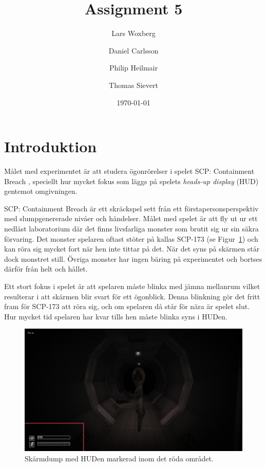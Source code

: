 \documentclass{article}
\author{Lars Woxberg \and Daniel Carlsson \and Philip Heilmair \and Thomas Sievert}
\date{\today}
\title{Assignment 5}
\begin{document}
\maketitle


\section{Introduktion}
Målet med experimentet är att studera ögonrörelser i spelet SCP: Containment Breach \cite{SCP}, speciellt hur mycket fokus som läggs på spelets \textit{heads-up display} (HUD) gentemot omgivningen. 

SCP: Containment Breach är ett skräckspel sett från ett förstapersonsperspektiv med slumpgenererade nivåer och händelser. Målet med spelet är att fly ut ur ett nedlåst laboratorium där det finns livsfarliga monster som brutit sig ur sin säkra förvaring. Det monster spelaren oftast stöter på kallas SCP-173 (se Figur~\ref{hud}) och kan röra sig mycket fort när hen inte tittar på det. När det syns på skärmen står dock monstret still. Övriga monster har ingen bäring på experimentet och bortses därför från helt och hållet.

Ett stort fokus i spelet är att spelaren måste blinka med jämna mellanrum vilket resulterar i att skärmen blir svart för ett ögonblick. Denna blinkning gör det fritt fram för SCP-173 att röra sig, och om spelaren då står för nära är spelet slut. Hur mycket tid spelaren har kvar tills hen måste blinka syns i HUDen.

\begin{figure}[h!]
    \begin{center}
        \includegraphics*[width=0.63\columnwidth]{experiment/SCP-173-06-aoi.png}
        \caption{Skärmdump med HUDen markerad inom det röda området.}
        \label{hud}
    \end{center}
\end{figure}
\end{document}

